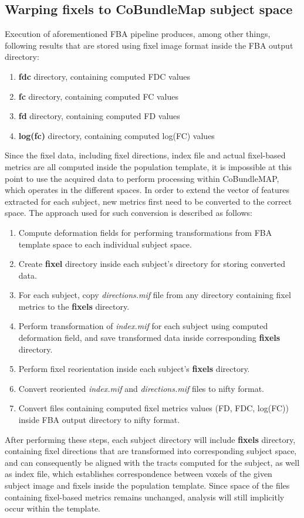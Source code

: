 \documentclass[thesis.tex]{subfiles}
\begin{document}
\subsection{Warping fixels to CoBundleMap subject space}
Execution of aforementioned FBA pipeline produces, among other things, following results that are stored using fixel image format inside the FBA output directory:
\begin{enumerate}
\item \textbf{fdc} directory, containing computed FDC values
\item \textbf{fc} directory, containing computed FC values
\item \textbf{fd} directory, containing computed FD values
\item \textbf{log(fc)} directory, containing computed log(FC) values
\end{enumerate}
Since the fixel data, including fixel directions, index file and actual fixel-based metrics are all computed inside the population template, it is impossible at this point to use the acquired data to perform processing within CoBundleMAP, which operates in the different spaces. In order to extend the vector of features extracted for each subject, new metrics first need to be converted to the correct space. The approach used for such conversion is described as follows:
\begin{enumerate}
\item Compute deformation fields for performing transformations from FBA template space to each individual subject space.
\item Create \textbf{fixel} directory inside each subject's directory for storing converted data.
\item For each subject, copy \textit{directions.mif} file from any directory containing fixel metrics to the \textbf{fixels} directory.
\item Perform transformation of \textit{index.mif} for each subject using computed deformation field, and save transformed data inside corresponding \textbf{fixels} directory.
\item Perform fixel reorientation inside each subject's \textbf{fixels} directory.
\item Convert reoriented \textit{index.mif} and \textit{directions.mif} files to nifty format.
\item Convert files containing computed fixel metrics values (FD, FDC, log(FC)) inside FBA output directory to nifty format.
\end{enumerate}
After performing these steps, each subject directory will include \textbf{fixels} directory, containing fixel directions that are transformed into corresponding subject space, and can consequently be aligned with the tracts computed for the subject, as well as index file, which establishes correspondence between voxels of the given subject image and fixels inside the population template. Since space of the files containing fixel-based metrics remains unchanged, analysis will still implicitly occur within the template.
\end{document}
